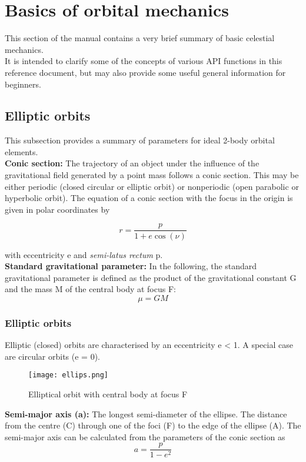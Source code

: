 \documentclass[Orbiter Developer Manual.tex]{subfiles}
\begin{document}
\section{Basics of orbital mechanics}
This section of the manual contains a very brief summary of basic celestial mechanics.\\
It is intended to clarify some of the concepts of various API functions in this reference document, but may also provide some useful general information for beginners.


\subsection{Elliptic orbits}%
This subsection provides a summary of parameters for ideal 2-body orbital elements.\\
\textbf{Conic section:} The trajectory of an object under the influence of the gravitational field generated by a point mass follows a conic section. This may be either periodic (closed circular or elliptic orbit) or nonperiodic (open parabolic or hyperbolic orbit). The equation of a conic section with the focus in the origin is given in polar coordinates by

\[ r = \frac{p}{1+e \cos(\nu)} \]

\noindent
with eccentricity e and \textit{semi-latus rectum} p.\\
\textbf{Standard gravitational parameter:} In the following, the standard gravitational parameter is defined as the product of the gravitational constant G and the mass M of the central body at focus F:
\[ \mu = GM \]


\subsubsection{Elliptic orbits}%
Elliptic (closed) orbits are characterised by an eccentricity e < 1. A special case are circular orbits (e = 0).

\begin{figure}[H]
  \centering
  \texttt{[image: ellips.png]}
  \caption{Elliptical orbit with central body at focus F}
\end{figure}

\noindent
\textbf{Semi-major axis (a):} The longest semi-diameter of the ellipse. The distance from the centre (C) through one of the foci (F) to the edge of the ellipse (A). The semi-major axis can be calculated from the parameters of the conic section as
\[ a = \frac{p}{1-e^2} \]
\end{document}
